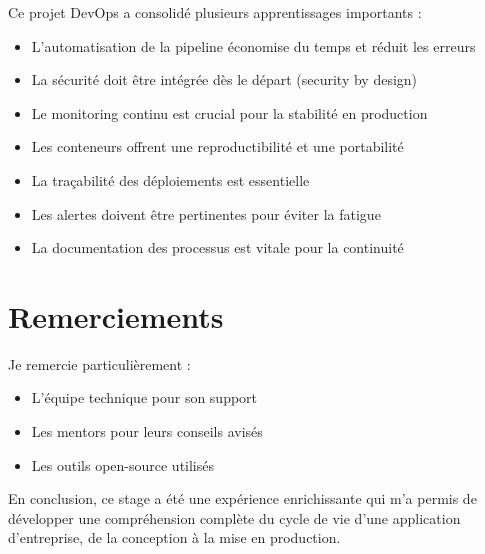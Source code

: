 \documentclass[12pt,a4paper]{report}
\begin{document}
Ce projet DevOps a consolidé plusieurs apprentissages importants :

\begin{itemize}
    \item L'automatisation de la pipeline économise du temps et réduit les erreurs
    \item La sécurité doit être intégrée dès le départ (security by design)
    \item Le monitoring continu est crucial pour la stabilité en production
    \item Les conteneurs offrent une reproductibilité et une portabilité
    \item La traçabilité des déploiements est essentielle
    \item Les alertes doivent être pertinentes pour éviter la fatigue
    \item La documentation des processus est vitale pour la continuité
\end{itemize}

\section*{Remerciements}

Je remercie particulièrement :
\begin{itemize}
    \item L'équipe technique pour son support
    \item Les mentors pour leurs conseils avisés
    \item Les outils open-source utilisés
\end{itemize}

\vspace{2cm}

En conclusion, ce stage a été une expérience enrichissante qui m'a permis de développer une compréhension complète du cycle de vie d'une application d'entreprise, de la conception à la mise en production.
\end{document}

